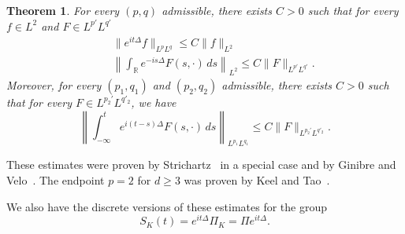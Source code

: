 \documentclass[10pt,a4paper]{article}
\newtheorem{theorem}{Theorem}[section]
\begin{document}
  \begin{theorem}
    For every \((p,q)\) admissible, there exists \(C > 0\) such that for every 
    \( f \in L^2 \) and \( F \in L^{p'} L^{q'} \)
    \begin{eqnarray}
      \label{Tc} & & \|e^{it \Delta} f \|_{L^p{L^q}} \leq C \| f\|_{L^2} \\
      \label{T*c} & & \left \| \int_{\mathbb R} e^{-is \Delta } F(s,\cdot)\, ds\right\|_{L^2} 
      \leq C \|F \|_{L^{p'} L^{q'}}.
    \end{eqnarray}
    Moreover, for every \((p_1, q_1)\) and \((p_2, q_2)\) admissible, there exists
    \(C > 0\) such that for every \(F \in L^{p_2'} L^{q'_2}\), we have
    \begin{equation}\label{TT*c} 
      \left\| \int_{-\infty}^t e^{i ( t-s ) \Delta } F(s,\cdot) \, ds \right\|_{L^{p_{1}} L^{q_{1}}}
      \leq  C \|F \|_{L^{p_{2}'} L^{q'_{2}}}.
    \end{equation}
  \end{theorem}

  These estimates were proven by Strichartz~\cite{Sz77} in a special case and by
  Ginibre and Velo~\cite{GiVl85}. The endpoint \(p=2\) for \(d \geq 3\) was proven by
  Keel and Tao~\cite{KeTa98}.

  We also have the discrete versions of these estimates for the group 
  \begin{equation}\label{SK}
    S_K(t) = e^{it\Delta} \Pi_K = \Pi e^{it\Delta}.
  \end{equation}

  
\end{document}
